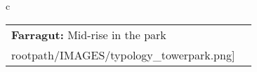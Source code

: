 \begin{table}[H]
        \begin{tabular}{c}
        \begin{tabular}{m{1.5in} m{2in}}
\textbf{Farragut:} {Mid-rise in the park} & \texttt{[image: \\rootpath/IMAGES/typology\_towerpark.png]}
\end{tabular}\end{tabular}
        \end{table}